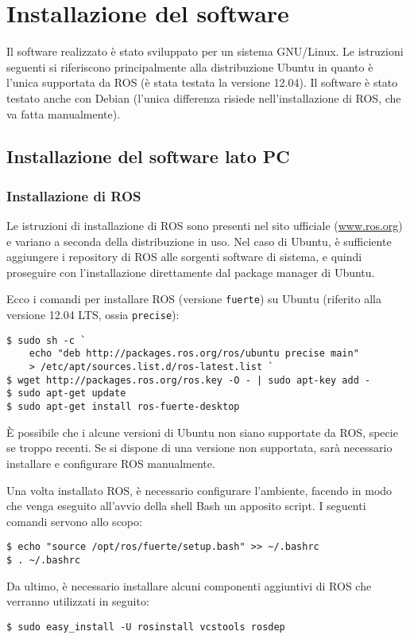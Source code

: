 \chapter{Installazione del software}
\label{cap:installazione}

Il software realizzato è stato sviluppato per un sistema GNU/Linux. Le istruzioni seguenti si riferiscono principalmente alla distribuzione Ubuntu \cite{UbuntuDistro} in quanto è l'unica supportata da ROS (è stata testata la versione 12.04). Il software è stato testato anche con Debian \cite{DebianDistro} (l'unica differenza risiede nell'installazione di ROS, che va fatta manualmente).

\section{Installazione del software lato PC}
\subsection*{Installazione di ROS} Le istruzioni di installazione di ROS sono presenti nel sito ufficiale (\url{www.ros.org}) e variano a seconda della distribuzione in uso. Nel caso di Ubuntu, è sufficiente aggiungere i repository di ROS alle sorgenti software di sistema, e quindi proseguire con l'installazione direttamente dal package manager di Ubuntu. 

\begin{nota} Ecco i comandi per installare ROS (versione \verb|fuerte|) su Ubuntu (riferito alla versione 12.04 LTS, ossia \verb|precise|):
\begin{verbatim}
$ sudo sh -c `
    echo "deb http://packages.ros.org/ros/ubuntu precise main" 
    > /etc/apt/sources.list.d/ros-latest.list `
$ wget http://packages.ros.org/ros.key -O - | sudo apt-key add -
$ sudo apt-get update
$ sudo apt-get install ros-fuerte-desktop
\end{verbatim}
È possibile che i alcune versioni di Ubuntu non siano supportate da ROS, specie se troppo recenti. Se si dispone di una versione non supportata, sarà necessario installare e configurare ROS manualmente. 

Una volta installato ROS, è necessario configurare l'ambiente, facendo in modo che venga eseguito all'avvio della shell Bash un apposito script. I seguenti comandi servono allo scopo:
\begin{verbatim}
$ echo "source /opt/ros/fuerte/setup.bash" >> ~/.bashrc
$ . ~/.bashrc
\end{verbatim}
Da ultimo, è necessario installare alcuni componenti aggiuntivi di ROS che verranno utilizzati in seguito:
\begin{verbatim}
$ sudo easy_install -U rosinstall vcstools rosdep
\end{verbatim}
\end{nota}


